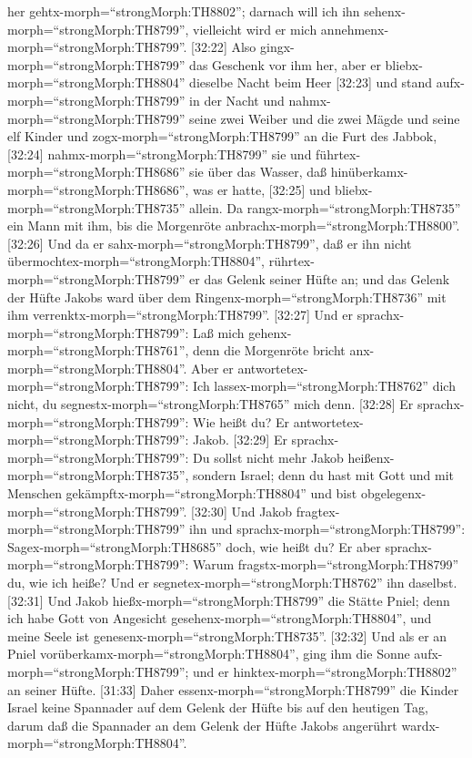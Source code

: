 her gehtx-morph=``strongMorph:TH8802''; darnach will ich ihn
sehenx-morph=``strongMorph:TH8799'', vielleicht wird er mich
annehmenx-morph=``strongMorph:TH8799''.  {[}32:22{]} Also
gingx-morph=``strongMorph:TH8799'' das Geschenk vor ihm her, aber er
bliebx-morph=``strongMorph:TH8804'' dieselbe Nacht beim Heer
 {[}32:23{]} und stand aufx-morph=``strongMorph:TH8799'' in
der Nacht und nahmx-morph=``strongMorph:TH8799'' seine zwei Weiber und
die zwei Mägde und seine elf Kinder und
zogx-morph=``strongMorph:TH8799'' an die Furt des Jabbok, 
{[}32:24{]} nahmx-morph=``strongMorph:TH8799'' sie und
führtex-morph=``strongMorph:TH8686'' sie über das Wasser, daß
hinüberkamx-morph=``strongMorph:TH8686'', was er hatte, 
{[}32:25{]} und bliebx-morph=``strongMorph:TH8735'' allein. Da
rangx-morph=``strongMorph:TH8735'' ein Mann mit ihm, bis die Morgenröte
anbrachx-morph=``strongMorph:TH8800''.  {[}32:26{]} Und da
er sahx-morph=``strongMorph:TH8799'', daß er ihn nicht
übermochtex-morph=``strongMorph:TH8804'',
rührtex-morph=``strongMorph:TH8799'' er das Gelenk seiner Hüfte an; und
das Gelenk der Hüfte Jakobs ward über dem
Ringenx-morph=``strongMorph:TH8736'' mit ihm
verrenktx-morph=``strongMorph:TH8799''.  {[}32:27{]} Und er
sprachx-morph=``strongMorph:TH8799'': Laß mich
gehenx-morph=``strongMorph:TH8761'', denn die Morgenröte bricht
anx-morph=``strongMorph:TH8804''. Aber er
antwortetex-morph=``strongMorph:TH8799'': Ich
lassex-morph=``strongMorph:TH8762'' dich nicht, du
segnestx-morph=``strongMorph:TH8765'' mich denn. 
{[}32:28{]} Er sprachx-morph=``strongMorph:TH8799'': Wie heißt du? Er
antwortetex-morph=``strongMorph:TH8799'': Jakob. 
{[}32:29{]} Er sprachx-morph=``strongMorph:TH8799'': Du sollst nicht
mehr Jakob heißenx-morph=``strongMorph:TH8735'', sondern Israel; denn du
hast mit Gott und mit Menschen gekämpftx-morph=``strongMorph:TH8804''
und bist obgelegenx-morph=``strongMorph:TH8799''. 
{[}32:30{]} Und Jakob fragtex-morph=``strongMorph:TH8799'' ihn und
sprachx-morph=``strongMorph:TH8799'': Sagex-morph=``strongMorph:TH8685''
doch, wie heißt du? Er aber sprachx-morph=``strongMorph:TH8799'': Warum
fragstx-morph=``strongMorph:TH8799'' du, wie ich heiße? Und er
segnetex-morph=``strongMorph:TH8762'' ihn daselbst. 
{[}32:31{]} Und Jakob hießx-morph=``strongMorph:TH8799'' die Stätte
Pniel; denn ich habe Gott von Angesicht
gesehenx-morph=``strongMorph:TH8804'', und meine Seele ist
genesenx-morph=``strongMorph:TH8735''.  {[}32:32{]} Und als
er an Pniel vorüberkamx-morph=``strongMorph:TH8804'', ging ihm die Sonne
aufx-morph=``strongMorph:TH8799''; und er
hinktex-morph=``strongMorph:TH8802'' an seiner Hüfte. 
{[}31:33{]} Daher essenx-morph=``strongMorph:TH8799'' die Kinder Israel
keine Spannader auf dem Gelenk der Hüfte bis auf den heutigen Tag, darum
daß die Spannader an dem Gelenk der Hüfte Jakobs angerührt
wardx-morph=``strongMorph:TH8804''.

